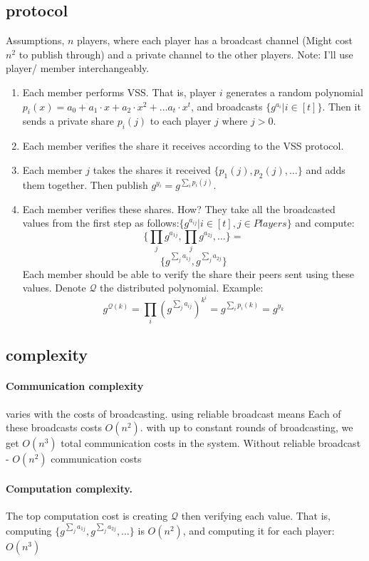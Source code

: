 \subsection{protocol}
Assumptions, $n$ players, where each player has a broadcast channel (Might cost $n^2$ to publish through) and
a private channel to the other players.
Note: I'll use player/ member interchangeably.
\begin{enumerate}
  \item Each member performs VSS.
  That is, player $i$ generates a random polynomial 
  $p_{i}(x)=a_0+a_1\cdot x +a_2\cdot x^2 +\dots a_t\cdot x^t$, and broadcasts $ \{g^{a_i} | i \in [t]\}$.
  Then it sends a private share $ p_{i}(j)$ to each player $j$ where $j>0$.
  \item Each member verifies the share it receives according to the VSS protocol.
  \item Each member $j$ takes the shares it received $\{p_{1}(j),p_{2}(j),\dots\}$ and adds them together. 
  Then publish $ g^{y_i}=g^{\sum_{i}{p_{i}(j)}}$.
  \item Each member verifies these shares. How? They take all the broadcasted values from the first step
  as follows:$ \{g^{a_{ij}} | i \in [t], j \in Players\}$ and compute:
  $$\{\prod_{j}{ g^{a_{1j}}}, \prod_{j}{ g^{a_{2j}}},\dots\}=$$
  $$\{ g^{\sum_{j}{a_{1j}}}, g^{\sum_{j}{a_{2j}}}\} $$ 
  Each member should be able to verify the share their peers sent using these values.
  Denote $\mathcal{Q}$ the distributed polynomial.
  Example:$$g^{\mathcal{Q}(k)}=\prod_{i}(g^{\sum_{j}{a_{ij}}})^{k^i}= g^{\sum_{i}{p_i(k)}}=g^{y_k}$$
\end{enumerate}
\subsection{complexity}
\paragraph{Communication complexity} varies with the costs of broadcasting. using reliable broadcast means
Each of these broadcasts costs $O(n^2)$. with up to constant rounds of broadcasting,
 we get $O(n^3)$ total communication costs in the system. 
 Without reliable broadcast - $O(n^2)$ communication costs
 \paragraph{Computation complexity.} The top computation cost is creating $\mathcal{Q}$ then verifying each value.
 That is, computing $ \{ g^{\sum_{j}{a_{1j}}}, g^{\sum_{j}{a_{2j}}},\dots\} $  is $O(n^2)$, and computing it for each player: $O(n^3)$ 



